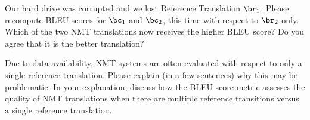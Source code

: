 \begin{parts}
\begin{subparts}
        
        \subpart[5] Our hard drive was corrupted and we lost Reference Translation $\br_1$. Please recompute BLEU scores for $\bc_1$ and $\bc_2$, this time with respect to $\br_2$ only. Which of the two NMT translations now receives the higher BLEU score? Do you agree that it is the better translation?
        
        
        \subpart[2] Due to data availability, NMT systems are often evaluated with respect to only a single reference translation. Please explain (in a few sentences) why this may be problematic. In your explanation, discuss how the BLEU score metric assesses the quality of NMT translations when there are multiple reference transitions versus a single reference translation.
        

\end{subparts}
\end{parts}
